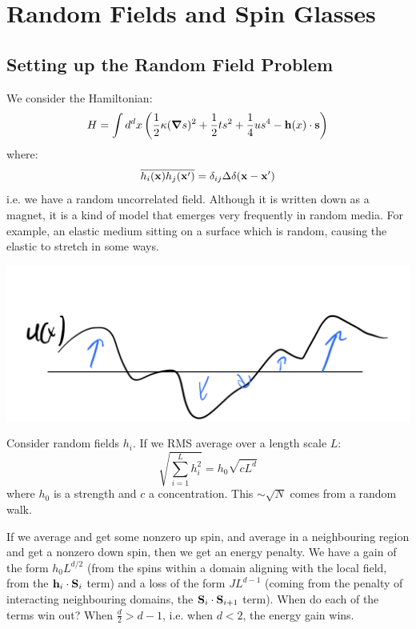 \section{Random Fields and Spin Glasses}
\subsection{Setting up the Random Field Problem}
We consider the Hamiltonian:
\begin{equation}
    H = \int d^dx \left(\frac{1}{2}\kappa (\nabla s)^2 + \frac{1}{2}ts^2 + \frac{1}{4}us^4 - \v{h}(x)\cdot \v{s}\right)
\end{equation}
where:
\begin{equation}
    \overline{h_i(\mathbf{x})h_j(\mathbf{x}')} = \delta_{ij}\Delta \delta (\mathbf{x} - \mathbf{x}')
\end{equation}
i.e. we have a random uncorrelated field. Although it is written down as a magnet, it is a kind of model that emerges very frequently in random media. For example, an elastic medium sitting on a surface which is random, causing the elastic to stretch in some ways.

\begin{center}
    \includegraphics[scale=0.35]{Lectures/Figures/lec13-randomelastic.png}
\end{center}

Consider random fields $h_i$. If we RMS average over a length scale $L$:
\begin{equation}
    \sqrt{\sum_{i=1}^L h_i^2} = h_0\sqrt{cL^d}
\end{equation}
where $h_0$ is a strength and $c$ a concentration. This $\sim \sqrt{N}$ comes from a random walk.

If we average and get some nonzero up spin, and average in a neighbouring region and get a nonzero down spin, then we get an energy penalty. We have a gain of the form $h_0 L^{d/2}$ (from the spins within a domain aligning with the local field, from the $\mathbf{h}_i \cdot \mathbf{S}_i$ term) and a loss of the form $JL^{d-1}$ (coming from the penalty of interacting neighbouring domains, the $\mathbf{S}_i \cdot \mathbf{S}_{i+1}$ term). When do each of the terms win out? When $\frac{d}{2} > d-1$, i.e. when $d < 2$, the energy gain wins.

